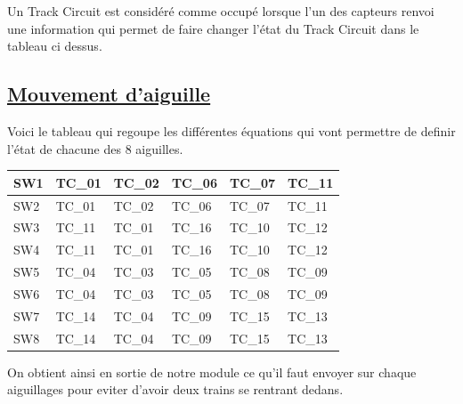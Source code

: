 Un Track Circuit est considéré comme occupé lorsque l'un des capteurs
renvoi une information qui permet de faire changer l'état du Track
Circuit dans le tableau ci dessus.


\subsection{\underline{Mouvement d'aiguille}}
\label{sec:mvt_aig}

Voici le tableau qui regoupe les différentes équations qui vont
permettre de definir l'état de chacune des 8 aiguilles.


\begin{center}
\begin{tabular}{|l||lllll|}
  \hline
  SW1 & TC\_01 & TC\_02 & TC\_06 & TC\_07 & TC\_11 \\
  \hline
  SW2 & TC\_01 & TC\_02 & TC\_06 & TC\_07 & TC\_11 \\
  \hline
  SW3 & TC\_11 & TC\_01 & TC\_16 & TC\_10 & TC\_12 \\
  \hline
  SW4 & TC\_11 & TC\_01 & TC\_16 & TC\_10 & TC\_12 \\
  \hline
  SW5 & TC\_04 & TC\_03 & TC\_05 & TC\_08 & TC\_09 \\
  \hline
  SW6 & TC\_04 & TC\_03 & TC\_05 & TC\_08 & TC\_09 \\
  \hline
  SW7 & TC\_14 & TC\_04 & TC\_09 & TC\_15 & TC\_13 \\
  \hline
  SW8 & TC\_14 & TC\_04 & TC\_09 & TC\_15 & TC\_13 \\
  \hline
\end{tabular}
\end{center}

On obtient ainsi en sortie de notre module ce qu'il faut envoyer sur
chaque aiguillages pour eviter d'avoir deux trains se rentrant dedans.

\newpage





